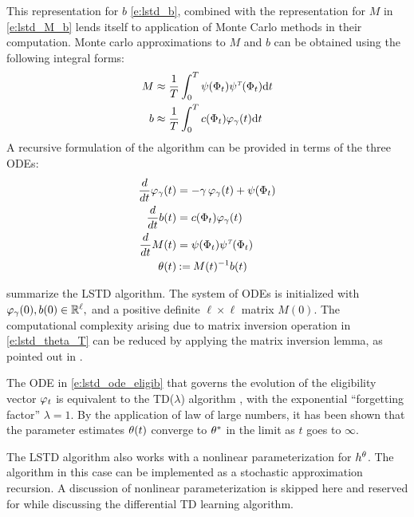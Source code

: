 This representation for $b$ \eqref{e:lstd_b}, combined with the representation for $M$ in \eqref{e:lstd_M_b} lends itself to application of Monte Carlo methods in their computation. Monte carlo approximations to $M$ and $b$ can be obtained using the following integral forms:
\begin{subequations}
\begin{align}
M &\approx \frac{1}{T} \int_0^T  \basis(\markovstate_t) \basis^\transpose(\markovstate_t) \ud t
\label{e:lstd_M_T}
\\
b & \approx  \frac{1}{T} \int_0^T c(\markovstate_t) \eligibvector_\discount(t) \ud t
\label{e:lstd_b_T}
\end{align}
\end{subequations}
A recursive formulation of the algorithm can be provided in terms of the three ODEs:
\begin{subequations}
\begin{align}
\ddt \eligibvector_\discount (t) &= - \discount\, \eligibvector_\discount(t) + \basis (\markovstate_t) 
\label{e:lstd_ode_eligib} \\
\ddt b(t) &=  c(\markovstate_t)\eligibvector_\discount(t)
 \label{e:lstd_ode_b}\\
\ddt M(t) &= \basis(\markovstate_t) \basis^\transpose(\markovstate_t) 
\label{e:lstd_ode_M} \\
\param(t) &\eqdef  M(t)^{-1} b(t)
\label{e:lstd_theta_T}
\end{align}
\end{subequations}

 summarize the LSTD algorithm. The system of ODEs is initialized with $\varphi_\gamma(0), b(0) \in \mathbb{R}^\ell,$ and a positive definite $\ell \times \ell$ matrix $M(0)$. The computational complexity arising due to matrix inversion operation in \eqref{e:lstd_theta_T} can be reduced by applying the matrix inversion lemma, as pointed out in \cite{ctcn}. 

The ODE in \eqref{e:lstd_ode_eligib} that governs the evolution of the eligibility vector $\varphi_t$ is equivalent to the TD($\lambda$) algorithm \cite{sut88}, with the exponential ``forgetting factor'' $\lambda = 1$. By the application of law of large numbers, it has been shown that the parameter estimates $\theta(t)$ converge to $\theta^*$ in the limit as $t$ goes to $\infty$. %

The LSTD algorithm also works with a nonlinear parameterization for $h^\theta$. The algorithm in this case can be implemented as a stochastic approximation recursion. A discussion of nonlinear parameterization is skipped here and reserved for  while discussing the differential TD learning algorithm. 


